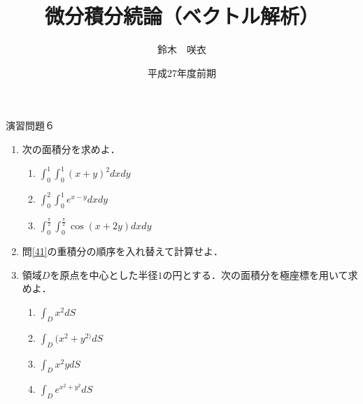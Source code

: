\documentclass{jarticle}
\begin{document}
\title{微分積分続論（ベクトル解析）} 
\author{鈴木　咲衣}
\date{平成27年度前期}
\maketitle

\begin{center} {\Large 演習問題６ } \end{center}
  \begin{enumerate}
  \item  \cite[問題4.1]{koba}次の面積分を求めよ． \label{41}
  \begin{enumerate}
  \item $\int_{0}^{1}\int_{0}^{1} (x+y)^{2}dxdy $
  \item $ \int_{0}^{2}\int_{0}^{1} e^{x-y}dxdy $
  \item $\int_{0}^{\frac{\pi}{2}} \int_{0}^{\frac{\pi}{2}} \cos(x+2y) dxdy $
  \end{enumerate}
  \item  \cite[問題4.2]{koba} 問\ref{41}の重積分の順序を入れ替えて計算せよ．
  \item  \cite[問題4.5]{koba} 領域$D$を原点を中心とした半径$1$の円とする．次の面積分を極座標を用いて求めよ．
  \begin{enumerate}
  \item $\int_{D} x^{2}dS$
  \item $\int_{D} (x^{2}+y^{2)}dS$
  \item$ \int_{D} x^{2}ydS$
  \item$ \int_{D} e^{x^{2}+y^{2}}dS$
  \end{enumerate}
  \end{enumerate}
\newpage
\end{document}
